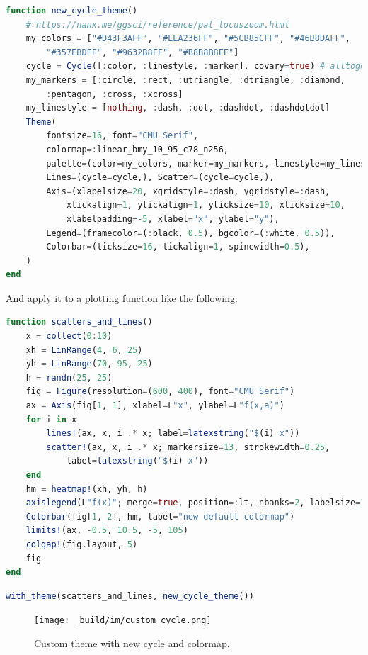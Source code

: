 \documentclass[
  notoc %
]{tufte-book}
\begin{document}
\begin{lstlisting}[language=Julia]
function new_cycle_theme()
    # https://nanx.me/ggsci/reference/pal_locuszoom.html
    my_colors = ["#D43F3AFF", "#EEA236FF", "#5CB85CFF", "#46B8DAFF",
        "#357EBDFF", "#9632B8FF", "#B8B8B8FF"]
    cycle = Cycle([:color, :linestyle, :marker], covary=true) # alltogether
    my_markers = [:circle, :rect, :utriangle, :dtriangle, :diamond,
        :pentagon, :cross, :xcross]
    my_linestyle = [nothing, :dash, :dot, :dashdot, :dashdotdot]
    Theme(
        fontsize=16, font="CMU Serif",
        colormap=:linear_bmy_10_95_c78_n256,
        palette=(color=my_colors, marker=my_markers, linestyle=my_linestyle),
        Lines=(cycle=cycle,), Scatter=(cycle=cycle,),
        Axis=(xlabelsize=20, xgridstyle=:dash, ygridstyle=:dash,
            xtickalign=1, ytickalign=1, yticksize=10, xticksize=10,
            xlabelpadding=-5, xlabel="x", ylabel="y"),
        Legend=(framecolor=(:black, 0.5), bgcolor=(:white, 0.5)),
        Colorbar=(ticksize=16, tickalign=1, spinewidth=0.5),
    )
end
\end{lstlisting}

And apply it to a plotting function like the following:

\begin{lstlisting}[language=Julia]
function scatters_and_lines()
    x = collect(0:10)
    xh = LinRange(4, 6, 25)
    yh = LinRange(70, 95, 25)
    h = randn(25, 25)
    fig = Figure(resolution=(600, 400), font="CMU Serif")
    ax = Axis(fig[1, 1], xlabel=L"x", ylabel=L"f(x,a)")
    for i in x
        lines!(ax, x, i .* x; label=latexstring("$(i) x"))
        scatter!(ax, x, i .* x; markersize=13, strokewidth=0.25,
            label=latexstring("$(i) x"))
    end
    hm = heatmap!(xh, yh, h)
    axislegend(L"f(x)"; merge=true, position=:lt, nbanks=2, labelsize=14)
    Colorbar(fig[1, 2], hm, label="new default colormap")
    limits!(ax, -0.5, 10.5, -5, 105)
    colgap!(fig.layout, 5)
    fig
end
\end{lstlisting}

\begin{lstlisting}[language=Julia]
with_theme(scatters_and_lines, new_cycle_theme())
\end{lstlisting}

\begin{figure}
\hypertarget{fig:custom_cycle}{%
\centering
\texttt{[image: \_build/im/custom\_cycle.png]}
\caption{Custom theme with new cycle and
colormap.}\label{fig:custom_cycle}
}
\end{figure}
\end{document}
